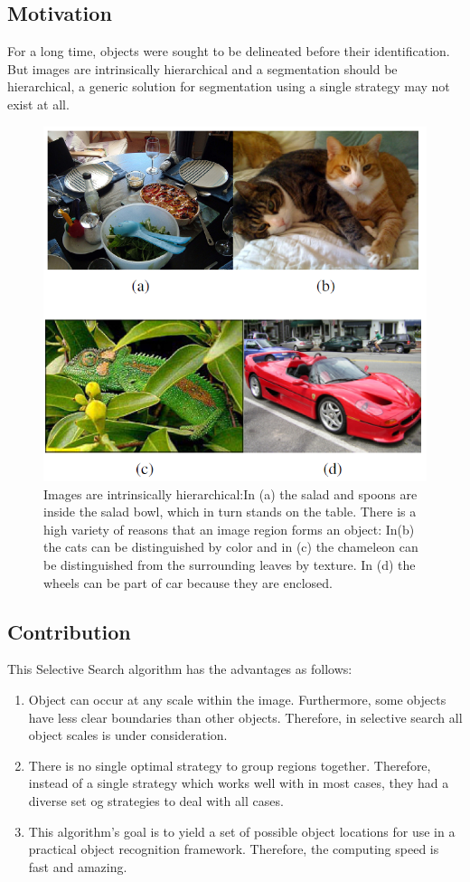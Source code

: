 \documentclass[a4paper]{article}
\begin{document}
      \subsection{Motivation}
        For a long time, objects were sought to be delineated before their identification. But images are intrinsically hierarchical and a segmentation should be hierarchical, a generic solution for segmentation using a single strategy may not exist at all. 
        \begin{figure}[h]
        \centering
        \includegraphics[width=0.7\linewidth]{screenshot004}
        \caption{Images are intrinsically hierarchical:In (a) the salad and spoons are inside the salad bowl, which in turn stands on the table. There is a high variety of reasons that an image region forms an object: In(b) the cats can be distinguished by color and in (c) the chameleon can be distinguished from the surrounding leaves by texture. In (d) the wheels can be part of car because they are enclosed.}
        \label{fig:screenshot004}
        \end{figure}

      \subsection{Contribution}
        This Selective Search algorithm has the advantages as follows:
        \begin{enumerate}
          \item Object can occur at any scale within the image. Furthermore, some objects have less clear boundaries than other objects. Therefore, in selective search all object scales is under consideration.
          \item There is no single optimal strategy to group regions together. Therefore, instead of a single strategy which works well with in most cases, they had a diverse set og strategies to deal with all cases.
          \item This algorithm's goal is to yield a set of possible object locations for use in a practical object recognition framework. Therefore, the computing speed is fast and amazing. 
        \end{enumerate}
\end{document}
